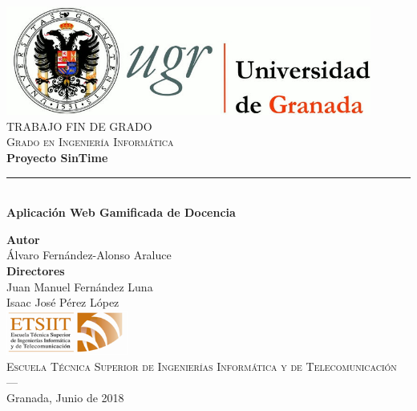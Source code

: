 \begin{titlepage}
 
\newlength{\centeroffset}
\setlength{\centeroffset}{-0.5\oddsidemargin}
\addtolength{\centeroffset}{0.5\evensidemargin}
\thispagestyle{empty}

\noindent\hspace*{\centeroffset}\begin{minipage}{\textwidth}

\centering
\includegraphics[width=0.9\textwidth]{imagenes/logo_ugr.jpg}\\[1.4cm]

\textsc{ \Large TRABAJO FIN DE GRADO\\[0.2cm]}
\textsc{ Grado en Ingeniería Informática }\\[1cm]
% 
{\Huge\bfseries Proyecto SinTime\\
}
\noindent\rule[-1ex]{\textwidth}{3pt}\\[3.5ex]
{\large\bfseries Aplicación Web Gamificada de Docencia}
\end{minipage}

\vspace{2.5cm}
\noindent\hspace*{\centeroffset}\begin{minipage}{\textwidth}
\centering

\textbf{Autor}\\ {Álvaro Fernández-Alonso Araluce}\\[2.5ex]
\textbf{Directores}\\
{Juan Manuel Fernández Luna}\\
{Isaac José Pérez López}\\[2cm]
\includegraphics[width=0.3\textwidth]{imagenes/etsiit_logo.png}\\[0.1cm]
\textsc{Escuela Técnica Superior de Ingenierías Informática y de Telecomunicación}\\
\textsc{---}\\
Granada, Junio de 2018
\end{minipage}
\end{titlepage}


